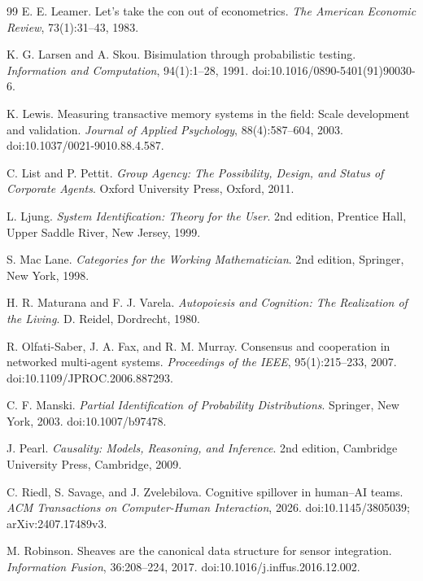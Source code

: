 \documentclass[11pt,oneside,openany]{book}
\numberwithin{equation}{section}
\begin{document}
\begin{thebibliography}{99}
E. E. Leamer.
\newblock Let's take the con out of econometrics.
\newblock \emph{The American Economic Review}, 73(1):31--43, 1983.

K. G. Larsen and A. Skou.
\newblock Bisimulation through probabilistic testing.
\newblock \emph{Information and Computation}, 94(1):1--28, 1991.
\newblock doi:10.1016/0890-5401(91)90030-6.

K. Lewis.
\newblock Measuring transactive memory systems in the field: Scale development and validation.
\newblock \emph{Journal of Applied Psychology}, 88(4):587--604, 2003.
\newblock doi:10.1037/0021-9010.88.4.587.

C. List and P. Pettit.
\newblock \emph{Group Agency: The Possibility, Design, and Status of Corporate Agents}.
\newblock Oxford University Press, Oxford, 2011.

L. Ljung.
\newblock \emph{System Identification: Theory for the User}.
\newblock 2nd edition, Prentice Hall, Upper Saddle River, New Jersey, 1999.

S. Mac Lane.
\newblock \emph{Categories for the Working Mathematician}.
\newblock 2nd edition, Springer, New York, 1998.

H. R. Maturana and F. J. Varela.
\newblock \emph{Autopoiesis and Cognition: The Realization of the Living}.
\newblock D. Reidel, Dordrecht, 1980.

R. Olfati-Saber, J. A. Fax, and R. M. Murray.
\newblock Consensus and cooperation in networked multi-agent systems.
\newblock \emph{Proceedings of the IEEE}, 95(1):215--233, 2007.
\newblock doi:10.1109/JPROC.2006.887293.

C. F. Manski.
\newblock \emph{Partial Identification of Probability Distributions}.
\newblock Springer, New York, 2003.
\newblock doi:10.1007/b97478.

J. Pearl.
\newblock \emph{Causality: Models, Reasoning, and Inference}.
\newblock 2nd edition, Cambridge University Press, Cambridge, 2009.

C. Riedl, S. Savage, and J. Zvelebilova.
\newblock Cognitive spillover in human--AI teams.
\newblock \emph{ACM Transactions on Computer-Human Interaction}, 2026.
\newblock doi:10.1145/3805039; arXiv:2407.17489v3.

M. Robinson.
\newblock Sheaves are the canonical data structure for sensor integration.
\newblock \emph{Information Fusion}, 36:208--224, 2017.
\newblock doi:10.1016/j.inffus.2016.12.002.


\end{thebibliography}
\end{document}
